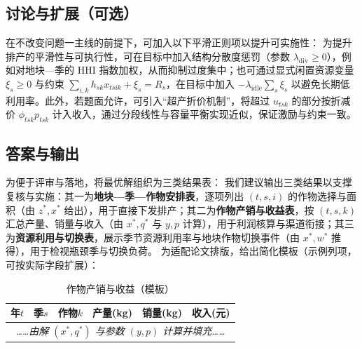 
\subsection{讨论与扩展（可选）}
在不改变问题一主线的前提下，可加入以下平滑正则项以提升可实施性：
为提升排产的平滑性与可执行性，可在目标中加入结构分散度惩罚（参数 $\lambda_{\mathrm{div}}\ge0$），例如对地块—季的 HHI 指数加权，从而抑制过度集中；也可通过显式闲置资源变量 $\xi_s\ge0$ 与约束 $\sum_{i,k} h_{sk}x_{tsik} + \xi_s = R_s$，在目标中加入 $-\lambda_{\mathrm{idle}}\sum_s \xi_s$ 以避免长期低利用率。此外，若题面允许，可引入“超产折价机制”，将超过 $u_{tsk}$ 的部分按折减价 $\phi_{tsk}p_{tsk}$ 计入收入，通过分段线性与容量平衡实现近似，保证激励与约束一致。

\subsection{答案与输出}
为便于评审与落地，将最优解组织为三类结果表：
我们建议输出三类结果以支撑复核与实施：其一为\textbf{地块—季—作物安排表}，逐项列出 $(t,s,i)$ 的作物选择与面积（由 $z^*,x^*$ 给出），用于直接下发排产；其二为\textbf{作物产销与收益表}，按 $(t,s,k)$ 汇总产量、销量与收入（由 $x^*,q^*$ 与 $y,p$ 计算），用于利润核算与渠道衔接；其三为\textbf{资源利用与切换表}，展示季节资源利用率与地块作物切换事件（由 $x^*,w^*$ 推得），用于检视瓶颈季与切换负荷。
为适配论文排版，给出简化模板（示例列项，可按实际字段扩展）：
\begin{table}[H]\centering
  \caption{作物产销与收益（模板）}\label{tab:out-sales}
  \begin{tabular}{@{}cccccc@{}}\toprule
    年$t$ & 季$s$ & 作物$k$ & 产量(kg) & 销量(kg) & 收入(元) \\\midrule
    \multicolumn{6}{c}{\emph{……由解 $(x^*,q^*)$ 与参数 $(y,p)$ 计算并填充……}} \\\bottomrule
  \end{tabular}
\end{table}


